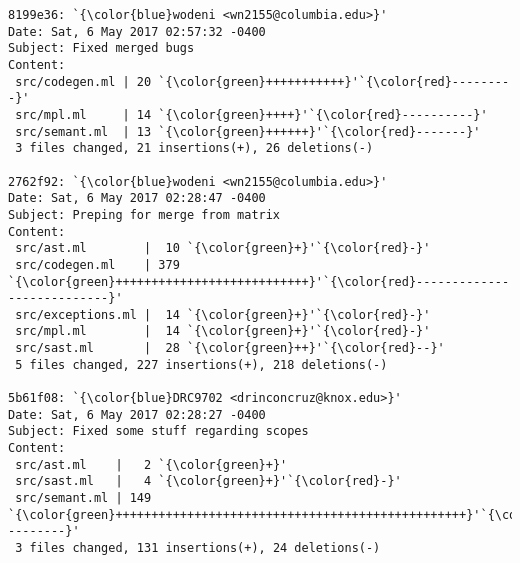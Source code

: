 \begin{lstlisting}
8199e36: `{\color{blue}wodeni <wn2155@columbia.edu>}'
Date: Sat, 6 May 2017 02:57:32 -0400
Subject: Fixed merged bugs
Content: 
 src/codegen.ml | 20 `{\color{green}+++++++++++}'`{\color{red}---------}'
 src/mpl.ml     | 14 `{\color{green}++++}'`{\color{red}----------}'
 src/semant.ml  | 13 `{\color{green}++++++}'`{\color{red}-------}'
 3 files changed, 21 insertions(+), 26 deletions(-)

2762f92: `{\color{blue}wodeni <wn2155@columbia.edu>}'
Date: Sat, 6 May 2017 02:28:47 -0400
Subject: Preping for merge from matrix
Content: 
 src/ast.ml        |  10 `{\color{green}+}'`{\color{red}-}'
 src/codegen.ml    | 379 `{\color{green}+++++++++++++++++++++++++++}'`{\color{red}---------------------------}'
 src/exceptions.ml |  14 `{\color{green}+}'`{\color{red}-}'
 src/mpl.ml        |  14 `{\color{green}+}'`{\color{red}-}'
 src/sast.ml       |  28 `{\color{green}++}'`{\color{red}--}'
 5 files changed, 227 insertions(+), 218 deletions(-)

5b61f08: `{\color{blue}DRC9702 <drinconcruz@knox.edu>}'
Date: Sat, 6 May 2017 02:28:27 -0400
Subject: Fixed some stuff regarding scopes
Content: 
 src/ast.ml    |   2 `{\color{green}+}'
 src/sast.ml   |   4 `{\color{green}+}'`{\color{red}-}'
 src/semant.ml | 149 `{\color{green}+++++++++++++++++++++++++++++++++++++++++++++++++}'`{\color{red}---------}'
 3 files changed, 131 insertions(+), 24 deletions(-)


\end{lstlisting}
